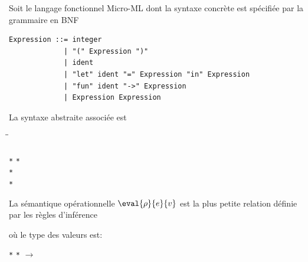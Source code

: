\documentclass[11pt,a4paper]{article}
\begin{document}
Soit le langage fonctionnel Micro-ML dont la syntaxe concrète est
spécifiée par la grammaire en BNF
{\small
\begin{verbatim}
Expression ::= integer
             | "(" Expression ")"
             | ident
             | "let" ident "=" Expression "in" Expression
             | "fun" ident "->" Expression
             | Expression Expression
\end{verbatim}
}
\noindent La syntaxe abstraite associée est
{\small
\begin{tabbing}
\Xtype {} \= \equal \=  \Xof {}\\
\> \vbar \>  \Xof {}\\
\> \vbar \>  \Xof {} \texttt{*} 
\texttt{*} \\
\> \vbar \>  \Xof {} \texttt{*} \\
\> \vbar \>  \Xof {} \texttt{*} 
\end{tabbing}
}
\noindent La sémantique opérationnelle $\eval{\rho}{e}{v}$ est la plus
petite relation définie par les règles d'inférence

\noindent où le type des valeurs est:

\Xtype {} \equal {} \Xof {} \vbar
{} \Xof {} \texttt{*}  \texttt{*}
\lpar{} $\rightarrow$ \rpar\semi{}
\end{document}
